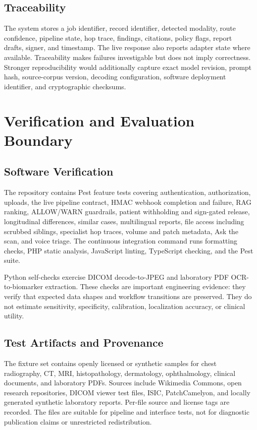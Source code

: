 \documentclass[conference]{IEEEtran}
\begin{document}
\subsection{Traceability}

The system stores a job identifier, record identifier, detected modality, route confidence, pipeline state, hop trace, findings, citations, policy flags, report drafts, signer, and timestamp. The live response also reports adapter state where available. Traceability makes failures investigable but does not imply correctness. Stronger reproducibility would additionally capture exact model revision, prompt hash, source-corpus version, decoding configuration, software deployment identifier, and cryptographic checksums.

\section{Verification and Evaluation Boundary}

\subsection{Software Verification}

The repository contains Pest feature tests covering authentication, authorization, uploads, the live pipeline contract, HMAC webhook completion and failure, RAG ranking, ALLOW/WARN guardrails, patient withholding and sign-gated release, longitudinal differences, similar cases, multilingual reports, file access including scrubbed siblings, specialist hop traces, volume and patch metadata, Ask the scan, and voice triage. The continuous integration command runs formatting checks, PHP static analysis, JavaScript linting, TypeScript checking, and the Pest suite.

Python self-checks exercise DICOM decode-to-JPEG and laboratory PDF OCR-to-biomarker extraction. These checks are important engineering evidence: they verify that expected data shapes and workflow transitions are preserved. They do not estimate sensitivity, specificity, calibration, localization accuracy, or clinical utility.

\subsection{Test Artifacts and Provenance}

The fixture set contains openly licensed or synthetic samples for chest radiography, CT, MRI, histopathology, dermatology, ophthalmology, clinical documents, and laboratory PDFs. Sources include Wikimedia Commons, open research repositories, DICOM viewer test files, ISIC, PatchCamelyon, and locally generated synthetic laboratory reports. Per-file source and license tags are recorded. The files are suitable for pipeline and interface tests, not for diagnostic publication claims or unrestricted redistribution.
\end{document}
